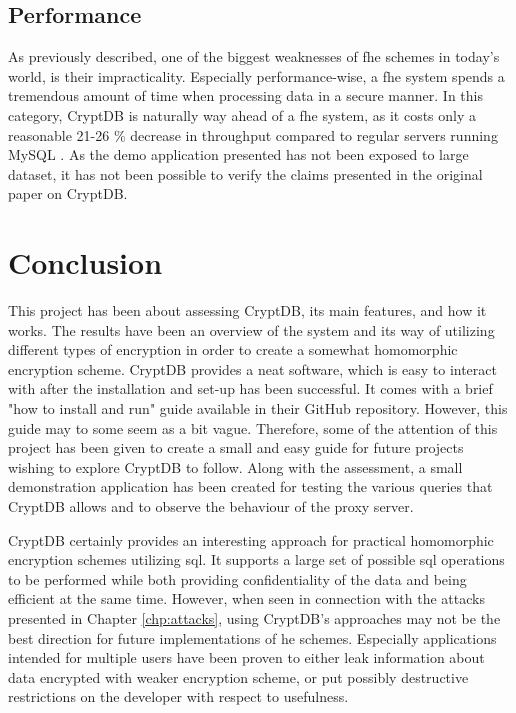 \subsection{Performance}

As previously described, one of the biggest weaknesses of \gls{fhe} schemes in today's world, is their impracticality. Especially performance-wise, a \gls{fhe} system spends a tremendous amount of time when processing data in a secure manner. In this category, CryptDB is naturally way ahead of a \gls{fhe} system, as it costs only a reasonable 21-26 \% decrease in throughput compared to regular servers running MySQL \cite{CryptDB_Main_Paper}. As the demo application presented has not been exposed to large dataset, it has not been possible to verify the claims presented in the original paper on CryptDB.

\section{Conclusion}

This project has been about assessing CryptDB, its main features, and how it works. The results have been an overview of the system and its way of utilizing different types of encryption in order to create a somewhat homomorphic encryption scheme. CryptDB provides a neat software, which is easy to interact with after the installation and set-up has been successful. It comes with a brief "how to install and run" guide available in their GitHub repository. However, this guide may to some seem as a bit vague. Therefore, some of the attention of this project has been given to create a small and easy guide for future projects wishing to explore CryptDB to follow. Along with the assessment, a small demonstration application has been created for testing the various queries that CryptDB allows and to observe the behaviour of the proxy server.


CryptDB certainly provides an interesting approach for practical homomorphic encryption schemes utilizing \gls{sql}. It supports a large set of possible \gls{sql} operations to be performed while both providing confidentiality of the data and being efficient at the same time. However, when seen in connection with the attacks presented in Chapter \ref{chp:attacks}, using CryptDB's approaches may not be the best direction for future implementations of \gls{he} schemes. Especially applications intended for multiple users have been proven to either leak information about data encrypted with weaker encryption scheme, or put possibly destructive restrictions on the developer with respect to usefulness. 


